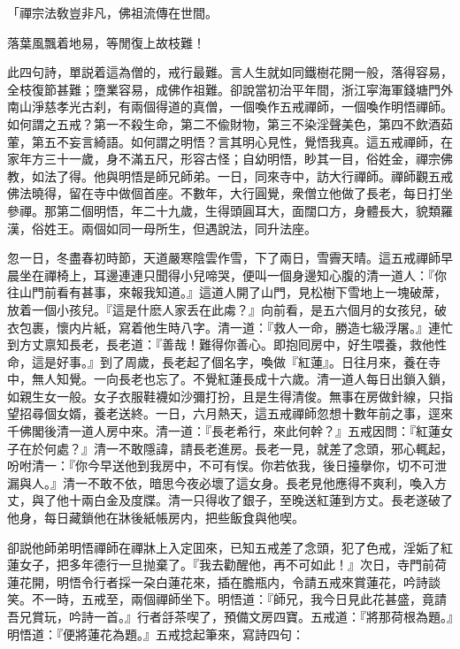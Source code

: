 \begin{myquote}
「禪宗法敎豈非凡，佛祖流傳在世間。

落葉風飄着地易，等閒復上故枝難！
\end{myquote}

\begin{myquote}[\markfont]
此四句詩，單説着這為僧的，戒行最難。言人生就如同鐵樹花開一般，落得容易，全枝復節甚難；墮業容易，成佛作祖難。卻說當初治平年間，浙江寜海軍錢塘門外南山淨慈孝光古刹，有兩個得道的真僧，一個喚作五戒禪師，一個喚作明悟禪師。如何謂之五戒？第一不殺生命，第二不偸財物，第三不染淫聲美色，第四不飲酒茹葷，第五不妄言綺語。如何謂之明悟？言其明心見性，覺悟我真。這五戒禪師，在家年方三十一歲，身不滿五尺，形容古怪；自幼明悟，眇其一目，俗姓金，禪宗佛教，如法了得。他與明悟是師兄師弟。一日，同來寺中，訪大行禪師。禪師觀五戒佛法曉得，留在寺中做個首座。不數年，大行圓覺，衆僧立他做了長老，每日打坐參禪。那第二個明悟，年二十九歲，生得頭圓耳大，面闊口方，身體長大，貌類羅漢，俗姓王。兩個如同一母所生，但遇說法，同升法座。

忽一日，冬盡春初時節，天道嚴寒陰雲作雪，下了兩日，雪霽天晴。這五戒禪師早晨坐在禪椅上，耳邊連連只聞得小兒啼哭，便叫一個身邊知心腹的清一道人：『你往山門前看有甚事，來報我知道。』這道人開了山門，見松樹下雪地上一塊破蓆，放着一個小孩兒。『這是什麽人家丢在此䖏？』向前看，是五六個月的女孩兒，破衣包裹，懷内片紙，寫着他生時八字。清一道：『救人一命，勝造七級浮屠。』連忙到方丈禀知長老，長老道：『善哉！難得你善心。即抱囘房中，好生喂養，救他性命，這是好事。』到了周歲，長老起了個名字，喚做『紅蓮』。日往月來，養在寺中，無人知覺。一向長老也忘了。不覺紅蓮長成十六歲。清一道人每日出鎖入鎖，如親生女一般。女子衣服鞋襪如沙彌打扮，且是生得清俊。無事在房做針線，只指望招尋個女婿，養老送終。一日，六月熱天，這五戒禪師忽想十數年前之事，逕來千佛閣後清一道人房中來。清一道：『長老希行，來此何幹？』五戒因問：『紅蓮女子在於何處？』清一不敢隱諱，請長老進房。長老一見，就差了念頭，邪心輒起，吩咐清一：『你今早送他到我房中，不可有悮。你若依我，後日擡擧你，切不可泄漏與人。』清一不敢不依，暗思今夜必壞了這女身。長老見他應得不爽利，喚入方丈，與了他十兩白金及度牒。清一只得收了銀子，至晚送紅蓮到方丈。長老遂破了他身，每日藏鎖他在牀後紙帳房内，把些飯食與他喫。

卻説他師弟明悟禪師在禪牀上入定囬來，已知五戒差了念頭，犯了色戒，淫姤了紅蓮女子，把多年德行一旦抛棄了。『我去勸醒他，再不可如此！』次日，寺門前荷蓮花開，明悟令行者採一朶白蓮花來，插在膽瓶内，令請五戒來賞蓮花，吟詩談笑。不一時，五戒至，兩個禪師坐下。明悟道：『師兄，我今日見此花甚盛，竟請吾兄賞玩，吟詩一首。』行者㧱茶喫了，預備文房四寶。五戒道：『將那荷根為題。』明悟道：『便將蓮花為題。』五戒捻起筆來，寫詩四句：


\end{myquote}
